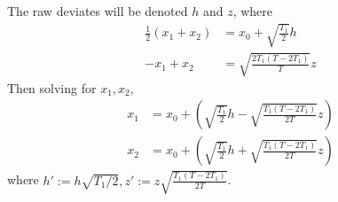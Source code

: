 The raw deviates will be denoted $h$ and $z$, where 
\begin{align}
  \frac{1}{2}(x_1+x_2) &= x_0 + \sqrt{\frac{T_1}{2}}h\\
  -x_1+x_2 &= \sqrt{\frac{2T_1(T-2T_1)}{T}}z
\end{align}
Then solving for $x_1, x_2$, 
\begin{align}
  x_1 & = x_0 + \left(\sqrt{\frac{T_1}{2}}h-\sqrt{\frac{T_1(T-2T_1)}{2T}}z\right)\\
  x_2 & = x_0 + \left(\sqrt{\frac{T_1}{2}}h+\sqrt{\frac{T_1(T-2T_1)}{2T}}z\right)
\end{align}
where $h' := h\sqrt{T_1/2}, z' := z\sqrt{\frac{T_1(T-2T_1)}{2T}}$.





  
